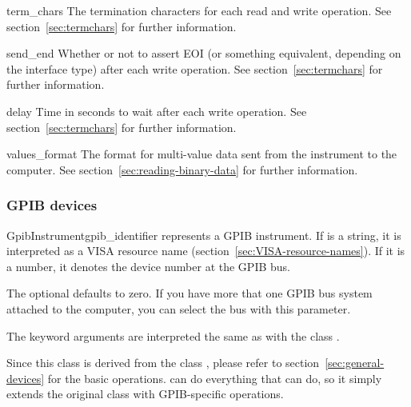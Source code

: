 \documentclass{howto}
\begin{document}
\begin{memberdesc}{term_chars}
  The termination characters for each read and write operation.  See
  section~\ref{sec:termchars} for further information.
\end{memberdesc}

\begin{memberdesc}{send_end}
  Whether or not to assert EOI (or something equivalent, depending on the
  interface type) after each write operation.  See section~\ref{sec:termchars}
  for further information.
\end{memberdesc}

\begin{memberdesc}{delay}
  Time in seconds to wait after each write operation.  See
  section~\ref{sec:termchars} for further information.
\end{memberdesc}

\begin{memberdesc}{values_format}
  The format for multi-value data sent from the instrument to the computer.
  See section~\ref{sec:reading-binary-data} for further information.
\end{memberdesc}


\subsubsection{GPIB devices}
\label{sec:gpib-devices}

\begin{classdesc}{GpibInstrument}{gpib_identifier}
  represents a GPIB instrument.  If  is a string, it is
  interpreted as a VISA resource name (section~\ref{sec:VISA-resource-names}).
  If it is a number, it denotes the device number at the GPIB bus.

  The optional  defaults to zero.  If you have more that one
  GPIB bus system attached to the computer, you can select the bus with this
  parameter.

  The keyword arguments are interpreted the same as with the class
  .
\end{classdesc}

\begin{notice}
  Since this class is derived from the class , please refer
  to section~\ref{sec:general-devices} for the basic operations.
   can do everything that  can do, so
  it simply extends the original class with GPIB-specific operations.
\end{notice}
\end{document}
